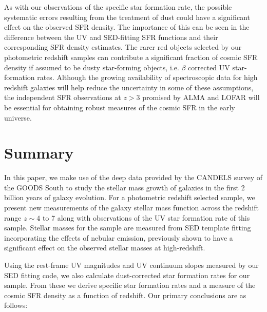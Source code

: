 As with our observations of the specific star formation rate, the possible systematic errors resulting from the treatment of dust could have a significant effect on the observed SFR density. The importance of this can be seen in the difference between the UV and SED-fitting SFR functions and their corresponding SFR density estimates. The rarer red objects selected by our photometric redshift samples can contribute a significant fraction of cosmic SFR density if assumed to be dusty star-forming objects, i.e. $\beta$ corrected UV star-formation rates. Although the growing availability of spectroscopic data for high redshift galaxies will help reduce the uncertainty in some of these assumptions, the independent SFR observations at $z > 3$ promised by ALMA and LOFAR will be essential for obtaining robust measures of the cosmic SFR in the early universe.

\section{Summary}\label{sec:summary}
In this paper, we make use of the deep data provided by the CANDELS survey of the GOODS South to study the stellar mass growth of galaxies in the first 2 billion years of galaxy evolution. For a photometric redshift selected sample, we present new measurements of the galaxy stellar mass function across the redshift range $z \sim 4$ to 7 along with observations of the UV star formation rate of this sample. Stellar masses for the sample are measured from SED template fitting incorporating the effects of nebular emission, previously shown to have a significant effect on the observed stellar masses at high-redshift. 

Using the rest-frame UV magnitudes and UV continuum slopes measured by our SED fitting code, we also calculate dust-corrected star formation rates for our sample. From these we derive specific star formation rates and a measure of the cosmic SFR density as a function of redshift. Our primary conclusions are as follows:

